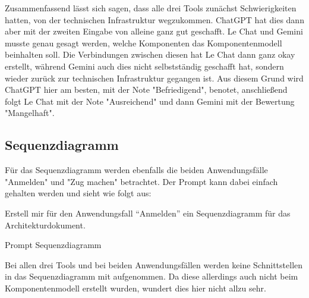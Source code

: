 Zusammenfassend lässt sich sagen, dass alle drei Tools zunächst Schwierigkeiten hatten, von der technischen Infrastruktur wegzukommen. ChatGPT 
hat dies dann aber mit der zweiten Eingabe von alleine ganz gut geschafft. Le Chat und Gemini musste genau gesagt werden, welche Komponenten das 
Komponentenmodell beinhalten soll. Die Verbindungen zwischen diesen hat Le Chat dann ganz okay erstellt, während Gemini auch dies nicht 
selbstständig geschafft hat, sondern wieder zurück zur technischen Infrastruktur gegangen ist. Aus diesem Grund wird ChatGPT hier am besten, mit 
der Note "Befriedigend", benotet, anschließend folgt Le Chat mit der Note "Ausreichend" und dann Gemini mit der Bewertung "Mangelhaft".

\subsection*{Sequenzdiagramm}

Für das Sequenzdiagramm werden ebenfalls die beiden Anwendungsfälle "Anmelden" und "Zug machen" betrachtet. Der Prompt 
kann dabei einfach gehalten werden und sieht wie folgt aus:

\begin{prompt}[H]
    \begin{tcolorbox}[colback=gray!20, colframe=gray!20, boxrule=0pt, sharp corners] 
        Erstell mir für den Anwendungsfall ``Anmelden'' ein Sequenzdiagramm für das Architekturdokument.
        \vfill
    \end{tcolorbox}
    \caption{Prompt Sequenzdiagramm}
    \label{Prompt Sequenzdiagramm}
\end{prompt}

Bei allen drei Tools und bei beiden Anwendungsfällen werden keine Schnittstellen in das Sequenzdiagramm mit 
aufgenommen. Da diese allerdings auch nicht beim Komponentenmodell erstellt wurden, wundert dies hier nicht allzu sehr.

